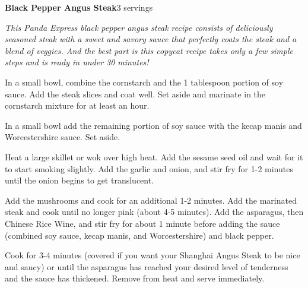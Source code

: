 \documentclass[../recipe-collections/cooking.tex]{subfiles}
\begin{document}
\begin{recipe}{\textbf{Black Pepper Angus Steak}}{3 servings}{}

  \freeform{}\textit{This Panda Express black pepper angus steak 
  recipe consists of deliciously seasoned steak with a sweet and 
  savory sauce that perfectly coats the steak and a blend of 
  veggies. And the best part is this copycat recipe takes only 
  a few simple steps and is ready in under 30 minutes!}



  In a small bowl, combine the cornstarch and the 1 tablespoon 
  portion of soy sauce. Add the steak slices and coat well. Set 
  aside and marinate in the cornstarch mixture for at least an hour.


  In a small bowl add the remaining portion of soy sauce with the 
  kecap manis and Worcestershire sauce. Set aside.


  Heat a large skillet or wok over high heat. Add the sesame seed oil 
  and wait for it to start smoking slightly. Add the garlic and onion, 
  and stir fry for 1-2 minutes until the onion begins to get translucent.


  Add the mushrooms and cook for an additional 1-2 minutes. Add the 
  marinated steak and cook until no longer pink (about 4-5 minutes). 
  Add the asparagus, then Chinese Rice Wine, and stir fry for about 
  1 minute before adding the sauce (combined soy sauce, kecap manis, 
  and Worcestershire) and black pepper.

  Cook for 3-4 minutes (covered if you want your Shanghai Angus Steak 
  to be nice and saucy) or until the asparagus has reached your desired 
  level of tenderness and the sauce has thickened. Remove from heat and 
  serve immediately.


\end{recipe}
\end{document}
